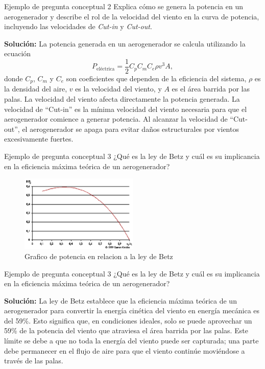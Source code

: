 \documentclass[
    10pt,
    aspectratio=169,
    xcolor={dvipsnames},
    spanish,
    ]{beamer}
\begin{document}
\begin{frame}
  \begin{block}{Ejemplo de pregunta conceptual 2}
    Explica cómo se genera la potencia en un aerogenerador y describe el rol de la velocidad del viento en la curva de potencia, incluyendo las velocidades de \textit{Cut-in} y \textit{Cut-out}.
  \end{block}
\textbf{Solución:} La potencia generada en un aerogenerador se calcula utilizando la ecuación 
\[
P_{\text{eléctrica}} = \frac{1}{2} C_p C_m C_e \rho v^3 A,
\]
donde \( C_p \), \( C_m \) y \( C_e \) son coeficientes que dependen de la eficiencia del sistema, \( \rho \) es la densidad del aire, \( v \) es la velocidad del viento, y \( A \) es el área barrida por las palas. La velocidad del viento afecta directamente la potencia generada. La velocidad de ``Cut-in'' es la mínima velocidad del viento necesaria para que el aerogenerador comience a generar potencia. Al alcanzar la velocidad de ``Cut-out'', el aerogenerador se apaga para evitar daños estructurales por vientos excesivamente fuertes.
\end{frame}
\begin{frame}
  \begin{block}{Ejemplo de pregunta conceptual 3}
    ¿Qué es la ley de Betz y cuál es su implicancia en la eficiencia máxima teórica de un aerogenerador?
  \end{block}
  \begin{figure}
    \centering
    \includegraphics[width=0.5\textwidth]{Figure_2.png}
    \caption{Grafico de potencia en relacion a la ley de Betz}
  \end{figure}
\end{frame}
\begin{frame}
  \begin{block}{Ejemplo de pregunta conceptual 3}
    ¿Qué es la ley de Betz y cuál es su implicancia en la eficiencia máxima teórica de un aerogenerador?
  \end{block}
\textbf{Solución:} La ley de Betz establece que la eficiencia máxima teórica de un aerogenerador para convertir la energía cinética del viento en energía mecánica es del 59\%. Esto significa que, en condiciones ideales, solo se puede aprovechar un 59\% de la potencia del viento que atraviesa el área barrida por las palas. Este límite se debe a que no toda la energía del viento puede ser capturada; una parte debe permanecer en el flujo de aire para que el viento continúe moviéndose a través de las palas.
\end{frame}
\end{document}
